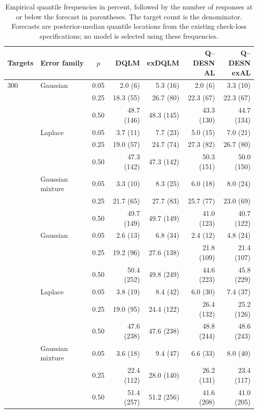 \begin{table}[!htbp]
\centering
\footnotesize
{}
\setlength{\tabcolsep}{3.5pt}
\begin{tabular}{@{}llcrrrr@{}}
\toprule
Targets & Error family & $p$ & DQLM & exDQLM & \shortstack{Q--DESN\\AL} & \shortstack{Q--DESN\\exAL} \\
\midrule
300 & Gaussian & 0.05 & 2.0 (6) & 5.3 (16) & 2.0 (6) & 3.3 (10) \\
 &  & 0.25 & 18.3 (55) & 26.7 (80) & 22.3 (67) & 22.3 (67) \\
 &  & 0.50 & 48.7 (146) & 48.3 (145) & 43.3 (130) & 44.7 (134) \\
\addlinespace[3pt]
 & Laplace & 0.05 & 3.7 (11) & 7.7 (23) & 5.0 (15) & 7.0 (21) \\
 &  & 0.25 & 19.0 (57) & 24.7 (74) & 27.3 (82) & 26.7 (80) \\
 &  & 0.50 & 47.3 (142) & 47.3 (142) & 50.3 (151) & 50.0 (150) \\
\addlinespace[3pt]
 & Gaussian mixture & 0.05 & 3.3 (10) & 8.3 (25) & 6.0 (18) & 8.0 (24) \\
 &  & 0.25 & 21.7 (65) & 27.7 (83) & 25.7 (77) & 23.0 (69) \\
 &  & 0.50 & 49.7 (149) & 49.7 (149) & 41.0 (123) & 40.7 (122) \\
\addlinespace[3pt]
500 & Gaussian & 0.05 & 2.6 (13) & 6.8 (34) & 2.4 (12) & 4.8 (24) \\
 &  & 0.25 & 19.2 (96) & 27.6 (138) & 21.8 (109) & 21.4 (107) \\
 &  & 0.50 & 50.4 (252) & 49.8 (249) & 44.6 (223) & 45.8 (229) \\
\addlinespace[3pt]
 & Laplace & 0.05 & 3.8 (19) & 8.4 (42) & 6.0 (30) & 7.4 (37) \\
 &  & 0.25 & 19.0 (95) & 24.4 (122) & 26.4 (132) & 25.2 (126) \\
 &  & 0.50 & 47.6 (238) & 47.6 (238) & 48.8 (244) & 48.6 (243) \\
\addlinespace[3pt]
 & Gaussian mixture & 0.05 & 3.6 (18) & 9.4 (47) & 6.6 (33) & 8.0 (40) \\
 &  & 0.25 & 22.4 (112) & 28.0 (140) & 26.2 (131) & 23.4 (117) \\
 &  & 0.50 & 51.4 (257) & 51.2 (256) & 41.6 (208) & 41.0 (205) \\
\bottomrule
\end{tabular}
\caption{Empirical quantile frequencies in percent, followed by the number of responses at or below the forecast in parentheses. The target count is the denominator. Forecasts are posterior-median quantile locations from the existing check-loss specifications; no model is selected using these frequencies.}
\label{qdesn2026:tab:supp-independent-quantile-calibration}
\end{table}
